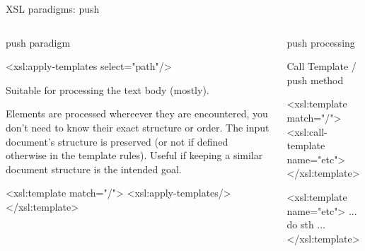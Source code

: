 \begin{frame}[fragile]{XSL paradigms:  push}
\footnotesize

\begin{columns}
\begin{block}{push paradigm}
\begin{xmlcode}
<xsl:apply-templates select="path"/>
\end{xmlcode}
Suitable for processing the text body (mostly).\smallskip

Elements are processed whereever they are encountered, you don't need to know their exact structure or order. The input document's structure is preserved (or not if defined otherwise in the template rules). Useful if keeping a similar document structure is the intended goal.

\begin{xmlcode}
<xsl:template match="/">
    <xsl:apply-templates/>
</xsl:template>
\end{xmlcode}

\end{block} 

\begin{block}{ push processing}

Call Template /  push method
\begin{xmlcode}
<xsl:template match="/">
    <xsl:call-template name="etc">
</xsl:template>

<xsl:template name="etc">
    ... do sth ...
</xsl:template>
\end{xmlcode}
\end{block}

\end{columns}

\end{frame}


